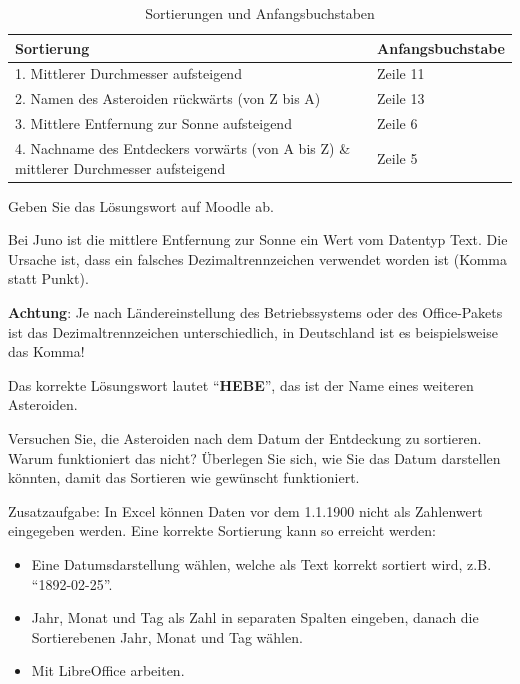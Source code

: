 \begin{myexercise}
    \begin{table}[H]
        \centering
        \begin{tabular}{p{10cm}|l}
            \toprule
            Sortierung                                                                             & Anfangsbuchstabe \\
            \midrule\midrule
            1. Mittlerer Durchmesser aufsteigend                                                   & Zeile 11         \\
            2. Namen des Asteroiden rückwärts (von Z bis A)                                        & Zeile 13         \\
            3. Mittlere Entfernung zur Sonne aufsteigend                                           & Zeile 6          \\
            4. Nachname des Entdeckers vorwärts (von A bis Z) \& mittlerer Durchmesser aufsteigend & Zeile 5          \\
            \bottomrule
        \end{tabular}
        \caption{Sortierungen und Anfangsbuchstaben}
    \end{table}
    Geben Sie das Lösungswort auf Moodle ab.
    \begin{myanswer}
        Bei Juno ist die mittlere Entfernung zur Sonne ein Wert vom Datentyp Text. Die Ursache ist, dass ein falsches Dezimaltrennzeichen verwendet worden ist (Komma statt Punkt).

        \textbf{Achtung}: Je nach Ländereinstellung des Betriebssystems oder des Office-Pakets ist das Dezimaltrennzeichen unterschiedlich, in Deutschland ist es beispielsweise das Komma!

        Das korrekte Lösungswort lautet \enquote{\textbf{HEBE}}, das ist der Name eines weiteren Asteroiden.
    \end{myanswer}
\end{myexercise}


\begin{mychallenge}
    Versuchen Sie, die Asteroiden nach dem Datum der Entdeckung zu sortieren. Warum funktioniert das nicht? Überlegen Sie sich, wie Sie das Datum darstellen könnten, damit das Sortieren wie gewünscht funktioniert.
    \begin{myanswer}
        Zusatzaufgabe: In Excel können Daten vor dem 1.1.1900 nicht als Zahlenwert eingegeben werden. Eine korrekte Sortierung kann so erreicht werden:

        \begin{itemize}
            \item  Eine Datumsdarstellung wählen, welche als Text korrekt sortiert wird, z.B. \enquote{1892-02-25}.
            \item Jahr, Monat und Tag als Zahl in separaten Spalten eingeben, danach die Sortierebenen Jahr, Monat und Tag wählen.
            \item Mit LibreOffice arbeiten.
        \end{itemize}
    \end{myanswer}
\end{mychallenge}
